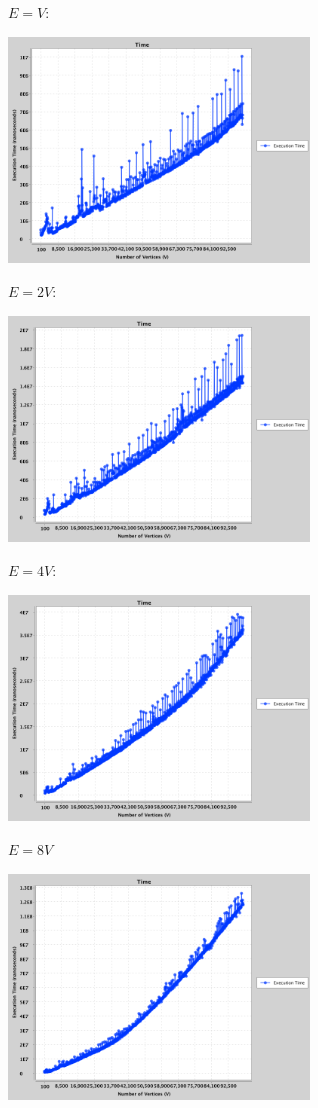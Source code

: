 \documentclass{article}
\begin{document}
\begin{enumerate}
    $E = V$: 
        \begin{center}
        \includegraphics[width=0.6\textwidth]{s4.png}
        \end{center}
    $E = 2V$: 
        \begin{center}
        \includegraphics[width=0.6\textwidth]{s5.png}
        \end{center}
        $E = 4V$: 
        \begin{center}
        \includegraphics[width=0.6\textwidth]{s6.png}
        \end{center}
    $E = 8V$ 
                    \begin{center}
        \includegraphics[width=0.6\textwidth]{s7.png}
        \end{center}
    

\end{enumerate}
\end{document}

